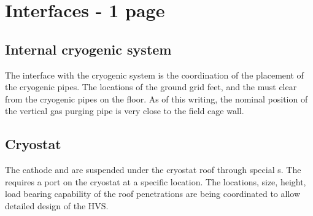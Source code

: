 



\section{Interfaces - 1 page}
\label{sec:fddp-hv-transport-interfaces}



\subsection{Internal cryogenic system}
\label{sec:fddp-hv-intfc-to-cryogenic}

The interface with the cryogenic system is the coordination of the placement of the cryogenic pipes. The locations of the ground grid feet, and the  must clear from the cryogenic pipes on the floor. As of this writing, the nominal position of the vertical gas purging pipe is very close to the field cage wall.


\subsection{Cryostat}
\label{sec:fddp-hv-intfc-to-cryostat}

The cathode and  are suspended under the cryostat roof through special \fdth{}s. The  \fdth requires a port on the cryostat at a specific location.  The locations, size, height, load bearing capability of the roof penetrations are being coordinated to allow detailed design of the HVS.



